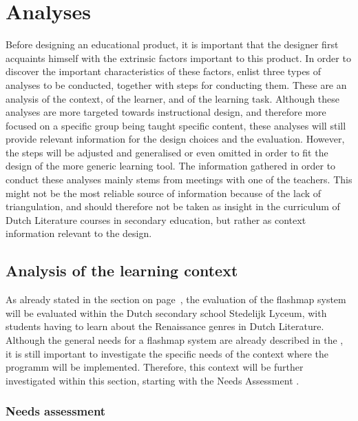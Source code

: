\chapter{Analyses}

\label{ch:analysis}

Before designing an educational product, it is important that the designer first acquaints himself with the extrinsic factors important to this product. In order to discover the important characteristics of these factors,  enlist three types of analyses to be conducted, together with steps for conducting them. These are an analysis of the context, of the learner, and of the learning task. Although these analyses are more targeted towards instructional design, and therefore more focused on a specific group being taught specific content, these analyses will still provide relevant information for the design choices and the evaluation. However, the steps will be adjusted and generalised or even omitted in order to fit the design of the more generic learning tool. The information gathered in order to conduct these analyses mainly stems from meetings with one of the teachers. This might not be the most reliable source of information because of the lack of triangulation, and should therefore not be taken as insight in the curriculum of Dutch Literature courses in secondary education, but rather as context information relevant to the design.

\section{Analysis of the learning context}

As already stated in the  section on page~\pageref{sec:intro_evaluation}, the evaluation of the flashmap system will be evaluated within the Dutch secondary school Stedelijk Lyceum, with students having to learn about the Renaissance genres in Dutch Literature. Although the general needs for a flashmap system are already described in the , it is still important to investigate the specific needs of the context where the programm will be implemented. Therefore, this context will be further investigated within this section, starting with the Needs Assessment \cite{instructionaldesign}. 

\subsection{Needs assessment}

